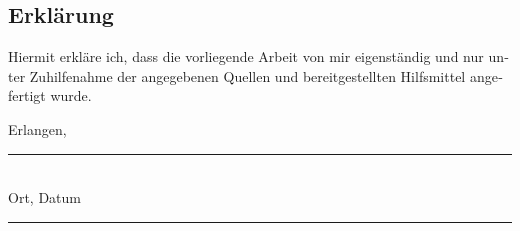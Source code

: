
\cleardoublepage

\thispagestyle{empty}
\makeatletter
\begin{otherlanguage}{ngerman}

\section*{Erklärung}


Hiermit erkläre ich, dass die vorliegende Arbeit \glqq\@title\grqq\xspace von mir eigenständig und nur unter Zuhilfenahme der angegebenen Quellen und bereitgestellten Hilfsmittel angefertigt wurde.

\vspace{1cm}

\parbox{\textwidth}{
  \parbox{7cm}{
    \centering
    Erlangen, \@date\\
    \rule{6cm}{1pt}\\
    Ort, Datum
  }
  \hfill
  \parbox{7cm}{
    \centering
    \phantom{Erlangen, \@date}
    \rule{6cm}{1pt}\\
    \@author
  }
}

\end{otherlanguage}
\makeatother